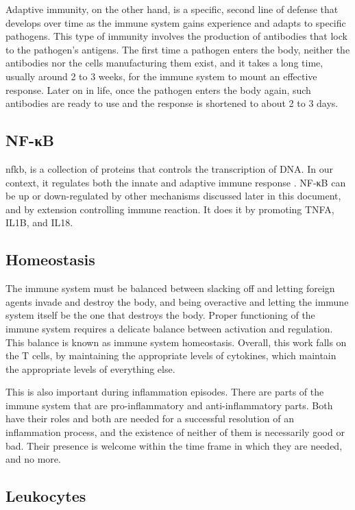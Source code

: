 Adaptive immunity, on the other hand, is a specific, second line of defense that develops over time as the immune system gains experience and adapts to specific pathogens. This type of immunity involves the production of antibodies that lock to the pathogen's antigens. The first time a pathogen enters the body, neither the antibodies nor the cells manufacturing them exist, and it takes a long time, usually around 2 to 3 weeks, for the immune system to mount an effective response. Later on in life, once the pathogen enters the body again, such antibodies are ready to use and the response is shortened to about 2 to 3 days.

\subsection{NF-κB}
\label{inf:nfkb}

\gls{nfkb}, is a collection of proteins that controls the transcription of DNA. In our context, it regulates both the innate and adaptive immune response \cite{Smith2006}. NF-κB can be up or down-regulated by other mechanisms discussed later in this document, and by extension controlling immune reaction. It does it by promoting TNFA, IL1B, and IL18.


\subsection{Homeostasis}

The immune system must be balanced between slacking off and letting foreign agents invade and destroy the body, and being overactive and letting the immune system itself be the one that destroys the body. Proper functioning of the immune system requires a delicate balance between activation and regulation. This balance is known as immune system homeostasis. Overall, this work falls on the T cells, by maintaining the appropriate levels of cytokines, which maintain the appropriate levels of everything else.

This is also important during inflammation episodes. There are parts of the immune system that are pro-inflammatory and anti-inflammatory parts. Both have their roles and both are needed for a successful resolution of an inflammation process, and the existence of neither of them is necessarily good or bad. Their presence is welcome within the time frame in which they are needed, and no more.

\subsection{Leukocytes}
\label{in:leukocytes}

